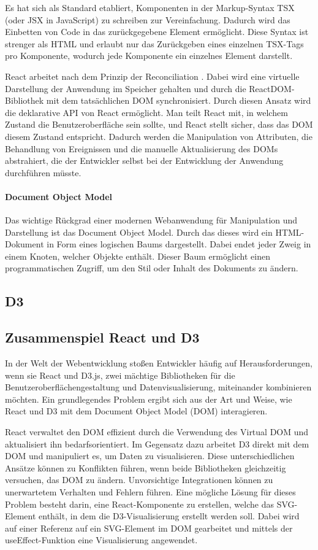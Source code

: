 \documentclass[
  ngerman,
  a4paper,  %
  twoside,  %
  bibliography=totoc,
  headsepline,
  cleardoublepage=empty,
  parskip=half,
  draft=false
]{scrbook}
\begin{document}
Es hat sich als Standard etabliert, Komponenten in der Markup-Syntax TSX (oder JSX in JavaScript) zu schreiben zur Vereinfachung. Dadurch wird das Einbetten von Code in das zurückgegebene Element ermöglicht. Diese Syntax ist strenger als HTML und erlaubt nur das Zurückgeben eines einzelnen TSX-Tags pro Komponente, wodurch jede Komponente ein einzelnes Element darstellt.

React arbeitet nach dem Prinzip der Reconciliation \cite{virtualDOM}. Dabei wird eine virtuelle Darstellung der Anwendung im Speicher gehalten und durch die ReactDOM-Bibliothek mit dem tatsächlichen DOM synchronisiert. Durch diesen Ansatz wird die deklarative API von React ermöglicht. Man teilt React mit, in welchem Zustand die Benutzeroberfläche sein sollte, und React stellt sicher, dass das DOM diesem Zustand entspricht. Dadurch werden die Manipulation von Attributen, die Behandlung von Ereignissen und die manuelle Aktualisierung des DOMs abstrahiert, die der Entwickler selbst bei der Entwicklung der Anwendung durchführen müsste.

\paragraph{Document Object Model}

Das wichtige Rückgrad einer modernen Webanwendung für Manipulation und Darstellung ist das Document Object Model. Durch das dieses wird ein HTML-Dokument in Form eines logischen Baums dargestellt. Dabei endet jeder Zweig in einem Knoten, welcher Objekte enthält. Dieser Baum ermöglicht einen programmatischen Zugriff, um den Stil oder Inhalt des Dokuments zu ändern.






\subsection{D3}
\subsection{Zusammenspiel React und D3}
In der Welt der Webentwicklung stoßen Entwickler häufig auf Herausforderungen, wenn sie React und D3.js, zwei mächtige Bibliotheken für die Benutzeroberflächengestaltung und Datenvisualisierung, miteinander kombinieren möchten.
Ein grundlegendes Problem ergibt sich aus der Art und Weise, wie React und D3 mit dem Document Object Model (DOM) interagieren.

React verwaltet den DOM effizient durch die Verwendung des Virtual DOM und aktualisiert ihn bedarfsorientiert. Im Gegensatz dazu arbeitet D3 direkt mit dem DOM und manipuliert es, um Daten zu visualisieren. Diese unterschiedlichen Ansätze können zu Konflikten führen, wenn beide Bibliotheken gleichzeitig versuchen, das DOM zu ändern. Unvorsichtige Integrationen können zu unerwartetem Verhalten und Fehlern führen. Eine mögliche Lösung für dieses Problem besteht darin, eine React-Komponente zu erstellen, welche das SVG-Element enthält, in dem die D3-Visualisierung erstellt werden soll. Dabei wird auf einer Referenz auf ein SVG-Element im DOM gearbeitet und mittels der useEffect-Funktion eine Visualisierung angewendet.
\end{document}
